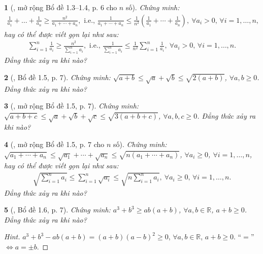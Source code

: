 \documentclass{article}
\newtheorem{baitoan}{}
\begin{document}
\begin{baitoan}[\cite{Son_Nghiep_Trung_Can_bdt}, mở rộng Bổ đề 1.3--1.4, p. 6 cho $n$ số]
	Chứng minh:
	\begin{align*}
		\frac{1}{a_1} + \ldots + \frac{1}{a_n}\ge\frac{n^2}{a_1 + \cdots + a_n},\mbox{ i.e., }\frac{1}{a_1 + \cdots + a_n}\le\frac{1}{n^2}\left(\frac{1}{a_1} + \cdots + \frac{1}{a_n}\right),\ \forall a_i > 0,\,\forall i = 1,\ldots,n,
	\end{align*}
	hay có thể được viết gọn lại như sau:
	\begin{align*}
		\sum_{i=1}^{n} \frac{1}{a_i}\ge\frac{n^2}{\sum_{i=1}^n a_i},\mbox{ i.e., }\frac{1}{\sum_{i=1}^n a_i}\le\frac{1}{n^2}\sum_{i=1}^n \frac{1}{a_i},\ \forall a_i > 0,\,\forall i = 1,\ldots,n.
	\end{align*}
	Đẳng thức xảy ra khi nào?
\end{baitoan}

\begin{baitoan}[\cite{Son_Nghiep_Trung_Can_bdt}, Bổ đề 1.5, p. 7]
	Chứng minh: $\sqrt{a + b}\le\sqrt{a} + \sqrt{b}\le\sqrt{2(a + b)}$, $\forall a,b\ge 0$. Đẳng thức xảy ra khi nào?
\end{baitoan}

\begin{baitoan}[\cite{Son_Nghiep_Trung_Can_bdt}, mở rộng Bổ đề 1.5, p. 7]
	Chứng minh: $\sqrt{a + b + c}\le\sqrt{a} + \sqrt{b} + \sqrt{c}\le\sqrt{3(a + b + c)}$, $\forall a,b,c\ge 0$. Đẳng thức xảy ra khi nào?
\end{baitoan}

\begin{baitoan}[\cite{Son_Nghiep_Trung_Can_bdt}, mở rộng Bổ đề 1.5, p. 7 cho $n$ số]
	Chứng minh: $\sqrt{a_1 + \cdots + a_n}\le\sqrt{a_1} + \cdots + \sqrt{a_n}\le\sqrt{n(a_1 + \cdots + a_n)}$, $\forall a_i\ge 0$, $\forall i = 1,\ldots,n$, hay có thể được viết gọn lại như sau:
	\begin{align*}
		\sqrt{\sum_{i=1}^n a_i}\le\sum_{i=1}^n \sqrt{a_i}\le\sqrt{n\sum_{i=1}^n a_i},\ \forall a_i\ge 0,\,\forall i = 1,\ldots,n.
	\end{align*}
	Đẳng thức xảy ra khi nào?
\end{baitoan}

\begin{baitoan}[\cite{Son_Nghiep_Trung_Can_bdt}, Bổ đề 1.6, p. 7]
	Chứng minh: $a^3 + b^3\ge ab(a + b)$, $\forall a,b\in\mathbb{R}$, $a + b\ge 0$. Đẳng thức xảy ra khi nào?
\end{baitoan}

\begin{proof}[Hint]
	$a^3 + b^3 - ab(a + b) = (a + b)(a - b)^2\ge 0$, $\forall a,b\in\mathbb{R}$, $a + b\ge 0$. ``$=$'' $\Leftrightarrow a = \pm b$.
\end{proof}
\end{document}

